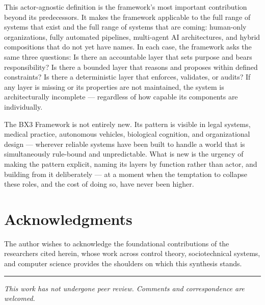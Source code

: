 \documentclass[12pt]{article}
\theoremstyle{plain}
\begin{document}
This actor-agnostic definition is the framework's most important contribution beyond its predecessors. It makes the framework applicable to the full range of systems that exist and the full range of systems that are coming: human-only organizations, fully automated pipelines, multi-agent AI architectures, and hybrid compositions that do not yet have names. In each case, the framework asks the same three questions: Is there an accountable layer that sets purpose and bears responsibility? Is there a bounded layer that reasons and proposes within defined constraints? Is there a deterministic layer that enforces, validates, or audits? If any layer is missing or its properties are not maintained, the system is architecturally incomplete --- regardless of how capable its components are individually.

The BX3 Framework is not entirely new. Its pattern is visible in legal systems, medical practice, autonomous vehicles, biological cognition, and organizational design --- wherever reliable systems have been built to handle a world that is simultaneously rule-bound and unpredictable. What is new is the urgency of making the pattern explicit, naming its layers by function rather than actor, and building from it deliberately --- at a moment when the temptation to collapse these roles, and the cost of doing so, have never been higher.

\section*{Acknowledgments}

The author wishes to acknowledge the foundational contributions of the researchers cited herein, whose work across control theory, sociotechnical systems, and computer science provides the shoulders on which this synthesis stands.




\vspace{2em}
\hrule
\vspace{0.5em}
\noindent\small\textit{This work has not undergone peer review. Comments and correspondence are welcomed.}
\end{document}
